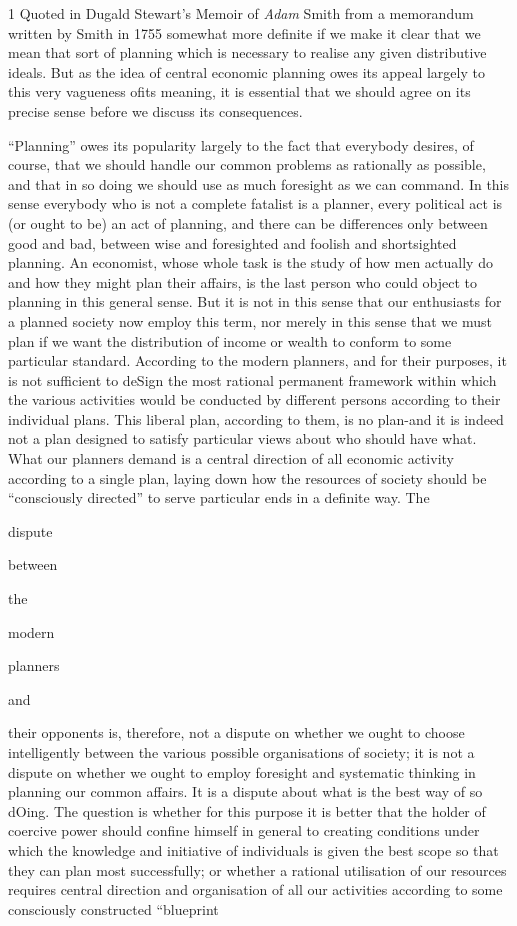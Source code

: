 \documentclass[11pt,openany]{book}
\begin{document}
1 Quoted in Dugald Stewart's Memoir of \emph{Adam} Smith from a memorandum written by Smith in 1755 somewhat more definite if we make it clear that we mean that sort of planning which is necessary to realise any given distributive ideals. But as the idea of central economic planning owes its appeal largely to this very vagueness ofits meaning, it is essential that we should agree on its precise sense before we discuss its consequences.

``Planning'' owes its popularity largely to the fact that everybody desires, of course, that we should handle our common problems as rationally as possible, and that in so doing we should use as much foresight as we can command. In this sense everybody who is not a complete fatalist is a planner, every political act is (or ought to be) an act of planning, and there can be differences only between good and bad, between wise and foresighted and foolish and shortsighted planning. An economist, whose whole task is the study of how men actually do and how they might plan their affairs, is the last person who could object to planning in this general sense. But it is not in this sense that our enthusiasts for a planned society now employ this term, nor merely in this sense that we must plan if we want the distribution of income or wealth to conform to some particular standard. According to the modern planners, and for their purposes, it is not sufficient to deSign the most rational permanent framework within which the various activities would be conducted by different persons according to their individual plans. This liberal plan, according to them, is no plan-and it is indeed not a plan designed to satisfy particular views about who should have what. What our planners demand is a central direction of all economic activity according to a single plan, laying down how the resources of society should be ``consciously directed'' to serve particular ends in a definite way. The

dispute

between

the

modern

planners

and

their opponents is, therefore, not a dispute on whether we ought to choose intelligently between the various possible organisations of society; it is not a dispute on whether we ought to employ foresight and systematic thinking in planning our common affairs. It is a dispute about what is the best way of so dOing. The question is whether for this purpose it is better that the holder of coercive power should confine himself in general to creating conditions under which the knowledge and initiative of individuals is given the best scope so that they can plan most successfully; or whether a rational utilisation of our resources requires central direction and organisation of all our activities according to some consciously constructed ``blueprint
\end{document}
